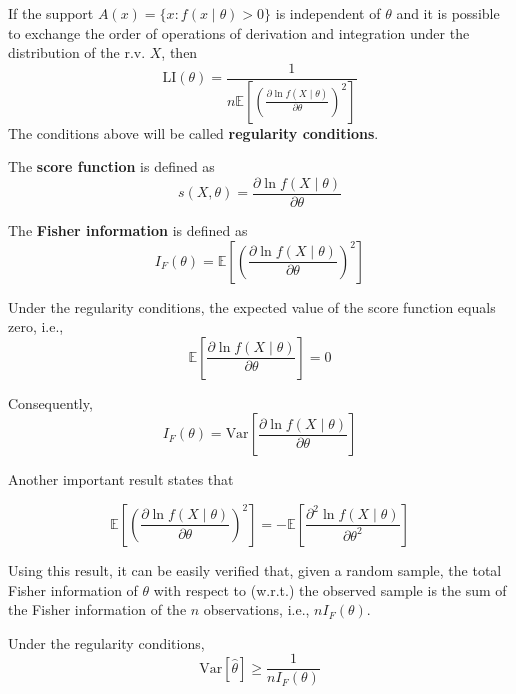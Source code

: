 \documentclass[12pt,a4paper]{report}
\begin{document}
\begin{theorem}
    If the support $A(x) = \{ x : f(x \mid \theta) > 0 \}$ is independent of $\theta$ and it is possible to exchange the order of operations of derivation and integration under the distribution of the r.v. $X$, then 
    \[
        \text{LI}(\theta) = \frac{1}{n \mathbb{E} \left[ \left( \frac{\partial \ln f( X \mid \theta)}{\partial \theta} \right)^2 \right]}
    \]
    The conditions above will be called \textbf{regularity conditions}.
\end{theorem}

\begin{definition}
    The \textbf{score function} is defined as 
    \[
        s(X, \theta) = \frac{\partial \ln f( X \mid \theta)}{\partial \theta}
    \]

    The \textbf{Fisher information} is defined as 
    \[
        I_F(\theta) = \mathbb{E} \left[ \left( \frac{\partial \ln f( X \mid \theta)}{\partial \theta} \right)^2 \right]
    \]
\end{definition}

\begin{theorem}
    Under the regularity conditions, the expected value of the score function equals zero, i.e., 
    \[
        \mathbb{E} \left[ \frac{\partial \ln f( X \mid \theta)}{\partial \theta} \right] = 0 
    \]

    Consequently, 
    \[
        I_F(\theta) = \text{Var} \left[ \frac{\partial \ln f( X \mid \theta)}{\partial \theta} \right]
    \]
\end{theorem}

Another important result states that 

\begin{theorem}
    \[
        \mathbb{E} \left[ \left( \frac{\partial \ln f( X \mid \theta)}{\partial \theta} \right)^2 \right] = - \mathbb{E} \left[ \frac{\partial^2 \ln f( X \mid \theta)}{\partial \theta^2} \right]
    \]    
\end{theorem}

Using this result, it can be easily verified that, given a random sample, the total Fisher information of $\theta$ with respect to (w.r.t.) the observed sample is the sum of the Fisher information of the $n$ observations, i.e., $n I_F(\theta)$. 

\begin{theorem}
    Under the regularity conditions, 
    \[
        \text{Var}[\hat{\theta}] \geq \frac{1}{n I_F(\theta)}
    \]
\end{theorem}
\end{document}
